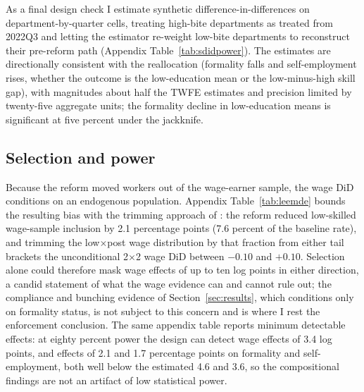 As a final design check I estimate synthetic difference-in-differences \citep{arkhangelsky_2021_sdid} on department-by-quarter cells, treating high-bite departments as treated from 2022Q3 and letting the estimator re-weight low-bite departments to reconstruct their pre-reform path (Appendix Table~\ref{tab:sdidpower}). The estimates are directionally consistent with the reallocation (formality falls and self-employment rises, whether the outcome is the low-education mean or the low-minus-high skill gap), with magnitudes about half the TWFE estimates and precision limited by twenty-five aggregate units; the formality decline in low-education means is significant at five percent under the jackknife.

\subsection{Selection and power}

Because the reform moved workers out of the wage-earner sample, the wage DiD conditions on an endogenous population. Appendix Table~\ref{tab:leemde} bounds the resulting bias with the trimming approach of \citet{lee_2009}: the reform reduced low-skilled wage-sample inclusion by 2.1 percentage points (7.6 percent of the baseline rate), and trimming the low$\times$post wage distribution by that fraction from either tail brackets the unconditional 2$\times$2 wage DiD between $-0.10$ and $+0.10$. Selection alone could therefore mask wage effects of up to ten log points in either direction, a candid statement of what the wage evidence can and cannot rule out; the compliance and bunching evidence of Section~\ref{sec:results}, which conditions only on formality status, is not subject to this concern and is where I rest the enforcement conclusion. The same appendix table reports minimum detectable effects: at eighty percent power the design can detect wage effects of 3.4 log points, and effects of 2.1 and 1.7 percentage points on formality and self-employment, both well below the estimated 4.6 and 3.6, so the compositional findings are not an artifact of low statistical power.

